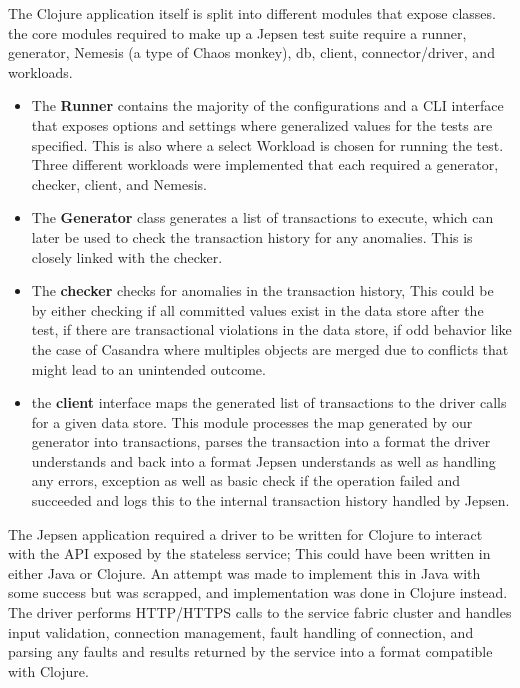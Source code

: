 \documentclass[a4paper,10pt,titlepage]{report}
\begin{document}
       
The Clojure application itself is split into different modules that expose classes. the core modules required to make up a Jepsen test suite require a runner, generator, Nemesis (a type of Chaos monkey)\cite{Choasmonkey}, db, client, connector/driver, and workloads.
\begin{itemize}
   \item The \textbf{Runner} contains the majority of the configurations and a CLI interface that exposes options and settings where generalized values for the tests are specified. This is also where a select Workload is chosen for running the test. Three different workloads were implemented that each required a generator, checker, client, and Nemesis.
       
  \item  The \textbf{Generator} class generates a list of transactions to execute, which can later be used to check the transaction history for any anomalies. This is closely linked with the checker.
       
  \item  The \textbf{checker} checks for anomalies in the transaction history, This could be by either checking if all committed values exist in the data store after the test, if there are transactional violations in the data store, if odd behavior like the case of Casandra where multiples objects are merged due to conflicts that might lead to an unintended outcome. 
       
 \item  the \textbf{client} interface maps the generated list of transactions to the driver calls for a given data store. This module processes the map generated by our generator into transactions, parses the transaction into a format the driver understands and back into a format Jepsen understands as well as handling any errors, exception as well as basic check if the operation failed and succeeded and logs this to the internal transaction history handled by Jepsen.
\end{itemize}
       
The Jepsen application required a driver to be written for Clojure to interact with the API exposed by the stateless service; This could have been written in either Java or Clojure. An attempt was made to implement this in Java with some success but was scrapped, and implementation was done in Clojure instead. The driver performs HTTP/HTTPS calls to the service fabric cluster and handles input validation, connection management, fault handling of connection, and parsing any faults and results returned by the service into a format compatible with Clojure.
       
\end{document}
